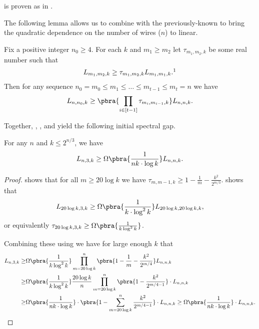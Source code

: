  is proven as  in .


The following lemma allows us to combine  with the previously-known  to bring the quadratic dependence on the number of wires ($n$) to linear.

\begin{lemma}\label{lem:induction}
    Fix a positive integer $n_0\geq 4$. For each $k$ and $m_1\geq m_2$ let $\tau_{m_1,m_2,k}$ be some real number such that
    \begin{align*}
        L_{m_1,m_2,k}\geq \tau_{m_1,m_2,k}L_{m_1,m_1,k}.\footnotemark
    \end{align*}
    Then for any sequence $n_0=m_0\leq m_1\leq \dots\leq m_{t-1}\leq m_t = n$ we have
    \begin{align*}
        L_{n,n_0,k}\geq \pbra{\prod_{i\in[t-1]}\tau_{m_i,m_{i-1},k}}L_{n,n,k}.
    \end{align*}
\end{lemma}

Together, , , and  yield the following initial spectral gap. 

\begin{corollary}\label{cor:initial spectral gap}
    For any $n$ and $k\leq 2^{n/3}$, we have
    \begin{align*}
        L_{n,3,k}\geq \Omega\pbra{\frac1{nk \cdot\log k}}L_{n,n,k}.
    \end{align*}
\end{corollary}
\begin{proof}
     shows that for all $m\geq 20\log k$ we have $\tau_{m,m-1,k}\geq 1-\frac1m-\frac{k^2}{2^{m/3}}$.  shows that 
    \begin{align*}
        L_{20\log k,3,k}\geq  \Omega\pbra{\frac1{k\cdot\log^2k }}L_{20\log k,20\log k,k},
    \end{align*}
    or equivalently $\tau_{20\log k,3,k}\geq \Omega\pbra{\frac1{k\log^2 k}}$.

    Combining these using  we have for large enough $k$ that
    \begin{align*}
        L_{n,3,k}\geq &\Omega\pbra{\frac1{k\log^2 k}}\prod_{m=20\log k}^{n}\pbra{1-\frac1m-\frac{k^2}{2^{m/4}}}L_{n,n,k}\\
        \geq &\Omega\pbra{\frac1{k\log^2 k}}\frac{20\log k}{n} \prod_{m=20\log k}^{n}\pbra{1-\frac{k^2}{2^{m/4-1}}}\cdot L_{n,n,k}\\
        \geq&\Omega\pbra{\frac1{nk\cdot\log k}}\cdot\pbra{1-\sum_{m=20\log k}^{n}\frac{k^2}{2^{m/4-1}}}\cdot L_{n,n,k} \geq \Omega\pbra{\frac1{nk\cdot\log k}}\cdot L_{n,n,k}.\qedhere
    \end{align*}
\end{proof}


